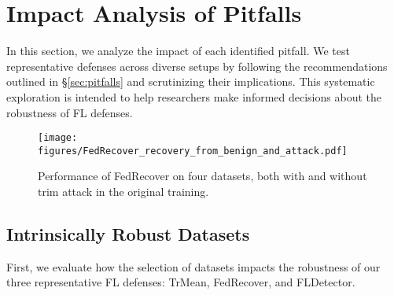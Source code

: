 \section{Impact Analysis of Pitfalls}\label{sec:impact}
In this section, we 
analyze the impact of each identified pitfall. We test representative defenses across diverse setups by following the recommendations outlined in \S\ref{sec:pitfalls} and scrutinizing their implications. This systematic exploration is intended to help researchers make informed decisions about the robustness of FL defenses.

\begin{figure}[t]
\centering
\hspace*{-.5cm}
\texttt{[image: figures/FedRecover\_recovery\_from\_benign\_and\_attack.pdf]}
\caption{Performance of FedRecover on four datasets, both with and without trim attack in the original training.}
\label{fig:fdr_recovery_benign_attack}
\end{figure}
\subsection{Intrinsically Robust Datasets}\label{impact:datasets}
First, we evaluate how the selection of datasets impacts the robustness of our three representative FL defenses: TrMean, FedRecover, and FLDetector.
